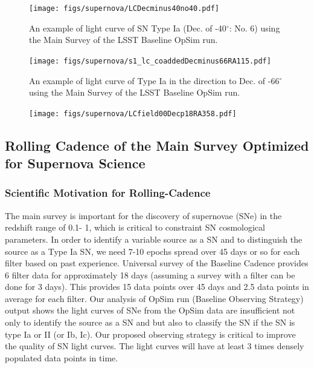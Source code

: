 \begin{figure}[tbh!]
\texttt{[image: figs/supernova/LCDecminus40no40.pdf]}
\caption{An example of light curve of SN Type Ia (Dec. of -40$^{\circ}$: No. 6) using
the Main Survey of the LSST Baseline OpSim run. }
\label{fig:SNIaLCminus40}
\end{figure}

\begin{figure}[tbh!]
\texttt{[image: figs/supernova/s1\_lc\_coaddedDecminus66RA115.pdf]}
\caption{An example of light curve of Type Ia in the direction to Dec. of -66$^{\circ}$
 using the Main Survey of the LSST Baseline OpSim run.
}
\label{fig:SNIaLCminus66}
\end{figure}


\begin{figure}[tbh!]
\texttt{[image: figs/supernova/LCfield00Decp18RA358.pdf]}
\caption{}
\label{fig:SNIaLCDecp18}
\end{figure}




\subsection{Rolling Cadence of the Main Survey Optimized for Supernova Science}

\subsubsection{ Scientific Motivation for Rolling-Cadence}

The main survey is important for the discovery of supernovae (SNe) in
the redshift range of 0.1- 1, which is critical to constraint SN
cosmological parameters. In order to identify a variable source as a SN
and to distinguish the source as a Type Ia SN, we need 7-10 epochs
spread over 45 days or so for each filter based on past experience.
Universal survey of the Baseline Cadence provides 6 filter data for
approximately 18 days (assuming a survey with a filter can be done for 3
days). This provides 15 data points over 45 days and 2.5 data points in
average for each filter. Our analysis of OpSim run (Baseline Observing
Strategy) output shows the light curves of SNe from the OpSim data are
insufficient not only to identify the source as a SN and but also to
classify the SN if the SN is type Ia or II (or Ib, Ic). Our proposed
observing strategy is critical to improve the quality of SN light
curves. The light curves will have at least 3 times densely populated
data points in time.

